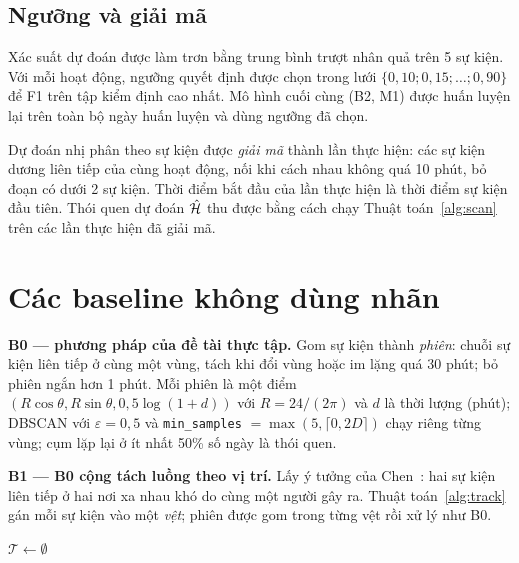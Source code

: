\subsection{Ngưỡng và giải mã}

Xác suất dự đoán được làm trơn bằng trung bình trượt nhân quả trên 5 sự kiện. Với mỗi hoạt động, ngưỡng
quyết định được chọn trong lưới $\{0{,}10; 0{,}15; \dots; 0{,}90\}$ để F1 trên tập kiểm định cao nhất.
Mô hình cuối cùng (B2, M1) được huấn luyện lại trên toàn bộ ngày huấn luyện và dùng ngưỡng đã chọn.

Dự đoán nhị phân theo sự kiện được \emph{giải mã} thành lần thực hiện: các sự kiện dương liên tiếp của
cùng hoạt động, nối khi cách nhau không quá 10 phút, bỏ đoạn có dưới 2 sự kiện. Thời điểm bắt đầu của
lần thực hiện là thời điểm sự kiện đầu tiên. Thói quen dự đoán $\hat{\mathcal{H}}$ thu được bằng cách chạy
Thuật toán~\ref{alg:scan} trên các lần thực hiện đã giải mã.

\section{Các baseline không dùng nhãn}
\label{sec:m-base}

\textbf{B0 --- phương pháp của đề tài thực tập.} Gom sự kiện thành \emph{phiên}: chuỗi sự kiện liên
tiếp ở cùng một vùng, tách khi đổi vùng hoặc im lặng quá 30 phút; bỏ phiên ngắn hơn 1 phút. Mỗi phiên
là một điểm $(R\cos\theta, R\sin\theta, 0{,}5\log(1+d))$ với $R = 24/(2\pi)$ và $d$ là thời lượng
(phút); DBSCAN với $\varepsilon = 0{,}5$ và \texttt{min\_samples} $= \max(5, \lceil 0{,}2 D\rceil)$
chạy riêng từng vùng; cụm lặp lại ở ít nhất 50\% số ngày là thói quen.

\textbf{B1 --- B0 cộng tách luồng theo vị trí.} Lấy ý tưởng của Chen~\cite{chen2021fcmcpd}: hai sự
kiện liên tiếp ở hai nơi xa nhau khó do cùng một người gây ra. Thuật toán~\ref{alg:track} gán mỗi sự
kiện vào một \emph{vệt}; phiên được gom trong từng vệt rồi xử lý như B0.

\begin{algorithm}[htbp]
\caption{Tách luồng sự kiện thành vệt theo vị trí (B1)}
\label{alg:track}
$\mathcal T \leftarrow \emptyset$ 
\end{algorithm}

